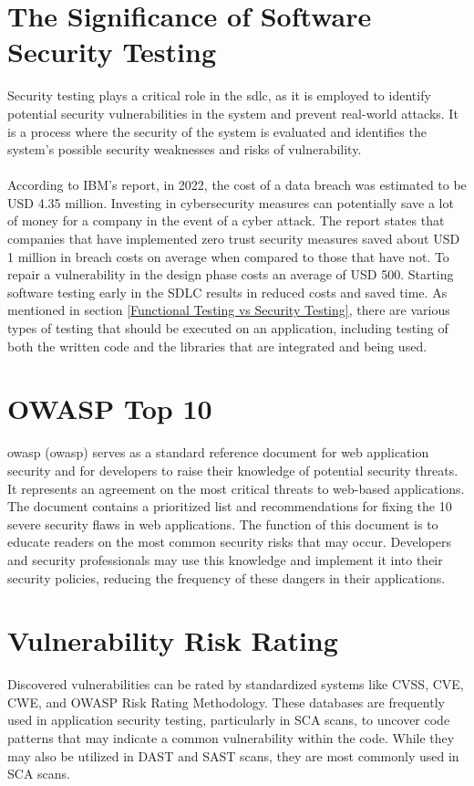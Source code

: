 \section{The Significance of Software Security Testing}
Security testing plays a critical role in the \acrlong{sdlc}, as it is employed to identify potential security vulnerabilities in the system and prevent real-world attacks. It is a process where the security of the system is evaluated and identifies the system's possible security weaknesses and risks of vulnerability. \cite{whysectest}
\\~\\
According to IBM's report, in 2022, the cost of a data breach was estimated to be USD 4.35 million\cite{databreach}. Investing in cybersecurity measures can potentially save a lot of money for a company in the event of a cyber attack. The report states that companies that have implemented zero trust security measures saved about USD 1 million in breach costs on average when compared to those that have not. To repair a vulnerability in the design phase costs an average of USD 500\cite{fixvulnerability}. Starting software testing early in the SDLC results in reduced costs and saved time. As mentioned in section \ref{Functional Testing vs Security Testing}, there are various types of testing that should be executed on an application, including testing of both the written code and the libraries that are integrated and being used.


\section{OWASP Top 10}
\acrlong{owasp} (\acrshort{owasp}) serves as a standard reference document for web application security and for developers to raise their knowledge of potential security threats. It represents an agreement on the most critical threats to web-based applications. The document contains a prioritized list and recommendations for fixing the 10 severe security flaws in web applications. The function of this document is to educate readers on the most common security risks that may occur. Developers and security professionals may use this knowledge and implement it into their security policies, reducing the frequency of these dangers in their applications. 


\section{Vulnerability Risk Rating}
Discovered vulnerabilities can be rated by standardized systems like CVSS, CVE, CWE, and OWASP Risk Rating Methodology. These databases are frequently used in application security testing, particularly in SCA scans, to uncover code patterns that may indicate a common vulnerability within the code. While they may also be utilized in DAST and SAST scans, they are most commonly used in SCA scans. 

